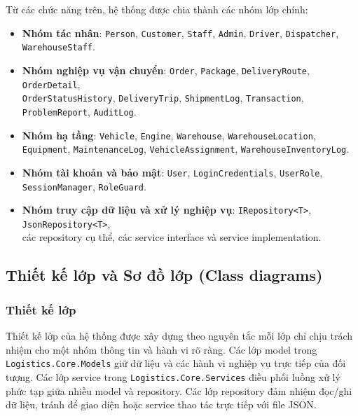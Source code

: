 \documentclass[12pt,a4paper]{article}
\begin{document}
Từ các chức năng trên, hệ thống được chia thành các nhóm lớp chính:

\begin{itemize}[leftmargin=1.2cm]
    \item \textbf{Nhóm tác nhân}: \texttt{Person}, \texttt{Customer}, \texttt{Staff}, \texttt{Admin}, \texttt{Driver}, \texttt{Dispatcher},\\
    \texttt{WarehouseStaff}.
    \item \textbf{Nhóm nghiệp vụ vận chuyển}: \texttt{Order}, \texttt{Package}, \texttt{DeliveryRoute}, \texttt{OrderDetail},\\
    \texttt{OrderStatusHistory}, \texttt{DeliveryTrip}, \texttt{ShipmentLog}, \texttt{Transaction}, \texttt{ProblemReport}, \texttt{AuditLog}.
    \item \textbf{Nhóm hạ tầng}: \texttt{Vehicle}, \texttt{Engine}, \texttt{Warehouse}, \texttt{WarehouseLocation},\\
    \texttt{Equipment}, \texttt{MaintenanceLog}, \texttt{VehicleAssignment}, \texttt{WarehouseInventoryLog}.
    \item \textbf{Nhóm tài khoản và bảo mật}: \texttt{User}, \texttt{LoginCredentials}, \texttt{UserRole},\\
    \texttt{SessionManager}, \texttt{RoleGuard}.
    \item \textbf{Nhóm truy cập dữ liệu và xử lý nghiệp vụ}: \texttt{IRepository<T>}, \texttt{JsonRepository<T>},\\
    các repository cụ thể, các service interface và service implementation.
\end{itemize}

\subsection{Thiết kế lớp và Sơ đồ lớp (Class diagrams)}

\subsubsection{Thiết kế lớp}

Thiết kế lớp của hệ thống được xây dựng theo nguyên tắc mỗi lớp chỉ chịu trách nhiệm cho một nhóm thông tin và hành vi rõ ràng. Các lớp model trong \texttt{Logistics.Core.Models} giữ dữ liệu và các hành vi nghiệp vụ trực tiếp của đối tượng. Các lớp service trong \texttt{Logistics.Core.Services} điều phối luồng xử lý phức tạp giữa nhiều model và repository. Các lớp repository đảm nhiệm đọc/ghi dữ liệu, tránh để giao diện hoặc service thao tác trực tiếp với file JSON.
\end{document}

